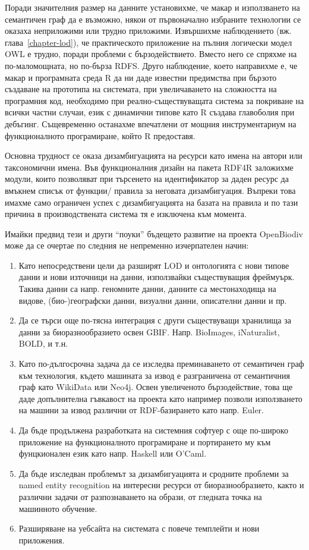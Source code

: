 Поради значителния размер на данните установихме, че макар и използването на семантичен граф да е възможно, някои от първоначално избраните технологии се оказаха неприложими или трудно приложими. Извършихме наблюдението (вж. глава~\ref{chapter-lod}), че практическото приложение на пълния логически модел OWL е трудно, поради проблеми с бързодействието. Вместо него се спряхме на по-маломощната, но по-бърза RDFS. Друго наблюдение, което направихме е, че макар и програмната среда R да ни даде известни предимства при бързото създаване на прототипа на системата, при увеличаването на сложността на програмния код, необходимо при реално-съществуващата система за покриване на всички частни случаи, език с динамични типове като R създава главоболия при дебъгинг. Същевременно останахме впечатлени от мощния инструментариум на функционалното програмиране, който R предоставя.

Основна трудност се оказа дизамбигуацията на ресурси като имена на автори или таксономични имена. Във функционалния дизайн на пакета RDF4R заложихме модули, които позволяват при търсенето на идентификатор за даден ресурс да вмъкнем списък от функции/ правила за неговата дизамбигуация. Въпреки това имахме само ограничен успех с дизамбигуацията на базата на правила и по тази причина в производствената система тя е изключена към момента.

Имайки предвид тези и други ``поуки'' бъдещето развитие на проекта OpenBiodiv може да се очертае по следния не непременно изчерпателен начин: 

\begin{enumerate}
    \item Като непосредствени цели да разширят LOD и онтологията с нови типове данни и нови източници на данни, използвайки съществуващия фреймуърк. Такива данни са напр. геномните данни, данните са местонаходища на видове, (био-)географски данни, визуални данни, описателни данни и пр.
    \item Да се търси още по-тясна интеграция с други съществуващи хранилища за данни за биоразнообразието освен GBIF. Напр. BioImages, iNaturalist, BOLD, и т.н.
    \item Като по-дългосрочна задача да се изследва преминаването от семантичен граф към технология, където машината за извод е разграничена от семантичния граф като WikiData или Neo4j. Освен увеличеното бързодействие, това ще даде допълнителна гъвкавост на проекта като например позволи използването на машини за извод различни от RDF-базирането като напр. Euler.
    \item Да бъде продължена разработката на системния софтуер с още по-широко приложение на функционалното програмиране и портирането му към фунцкионален език като напр. Haskell или O'Caml.
    \item Да бъде изследван проблемът за дизамбигуацията и сродните проблеми за named entity recognition на интересни ресурси от биоразнообразието, както и различни задачи от разпознаването на образи, от гледната точка на машинното обучение.
    \item Разширяване на уебсайта на системата с повече темплейти и нови приложения.
\end{enumerate}

